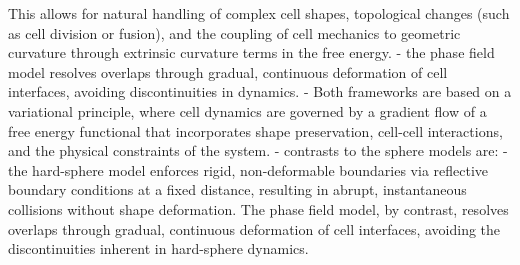 This allows for natural handling of complex cell shapes, topological changes (such as cell division or fusion), and the coupling of cell mechanics to geometric curvature through extrinsic curvature terms in the free energy. 
- the phase field model resolves overlaps through gradual, continuous deformation of cell interfaces, avoiding discontinuities in dynamics. 
- Both frameworks are based on a variational principle, where cell dynamics are governed by a gradient flow of a free energy functional that incorporates shape preservation, cell-cell interactions, and the physical constraints of the system. 
- contrasts to the sphere models are: 
- the hard-sphere model enforces rigid, non-deformable boundaries via reflective boundary conditions at a fixed distance, resulting in abrupt, instantaneous collisions without shape deformation.  The phase field model, by contrast, resolves overlaps through gradual, continuous deformation of cell interfaces, avoiding the discontinuities inherent in hard-sphere dynamics. \\

